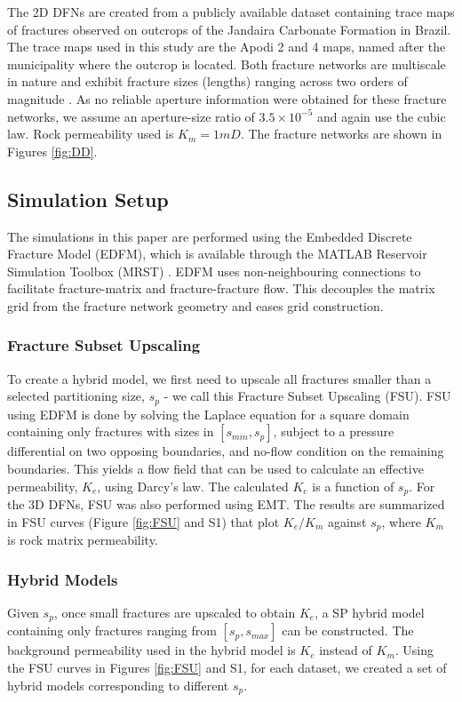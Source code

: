 \documentclass[draft]{agujournal2018}
\begin{document}
The 2D DFNs are created from a publicly available dataset containing trace maps of fractures observed on outcrops of the Jandaira Carbonate Formation in Brazil. The trace maps used in this study are the Apodi 2 and 4 maps, named after the municipality where the outcrop is located. Both fracture networks are multiscale in nature and exhibit fracture sizes (lengths) ranging across two orders of magnitude \citep{Bisdom2017}. As no reliable aperture information were obtained for these fracture networks, we assume an aperture-size ratio of $3.5\times 10^{-5}$ and again use the cubic law. Rock permeability used is $K_m=1mD$. The fracture networks are shown in Figures \ref{fig:DD}.


\subsection{Simulation Setup}
The simulations in this paper are performed using the Embedded Discrete Fracture Model (EDFM), which is available through the MATLAB Reservoir Simulation Toolbox (MRST) \citep{Lee2001, Lie2015, Moinfar2013}. EDFM uses non-neighbouring connections to facilitate fracture-matrix and fracture-fracture flow. This decouples the matrix grid from the fracture network geometry and eases grid construction. 

\subsubsection{Fracture Subset Upscaling}
To create a hybrid model, we first need to upscale all fractures smaller than a selected partitioning size, $s_p$ - we call this Fracture Subset Upscaling (FSU). FSU using EDFM is done by solving the Laplace equation for a square domain containing only fractures with sizes in $[s_{min},s_p]$, subject to a pressure differential on two opposing boundaries, and no-flow condition on the remaining boundaries. This yields a flow field that can be used to calculate an effective permeability, $K_{e}$, using Darcy's law. The calculated $K_{e}$ is a function of $s_p$. For the 3D DFNs, FSU was also performed using EMT. The results are summarized in FSU curves (Figure \ref{fig:FSU} and S1) that plot $K_{e}/K_m$ against $s_p$, where $K_m$ is rock matrix permeability.

\subsubsection{Hybrid Models}
Given $s_p$, once small fractures are upscaled to obtain $K_e$, a SP hybrid model containing only fractures ranging from $[s_p,s_{max}]$ can be constructed. The background permeability used in the hybrid model is $K_e$ instead of $K_m$. Using the FSU curves in Figures \ref{fig:FSU} and S1, for each dataset, we created a set of hybrid models corresponding to different $s_p$. 
\end{document}
